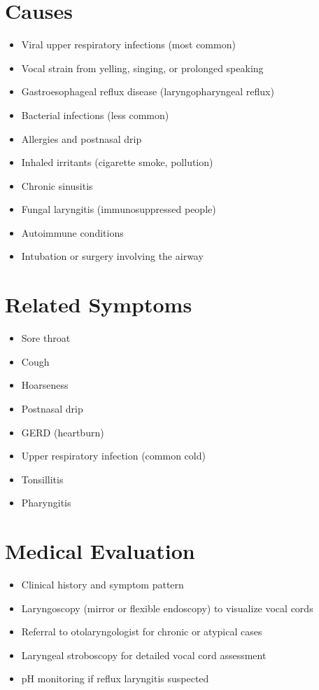 \section*{Causes}
\begin{itemize}
\item Viral upper respiratory infections (most common)
\item Vocal strain from yelling, singing, or prolonged speaking
\item Gastroesophageal reflux disease (laryngopharyngeal reflux)
\item Bacterial infections (less common)
\item Allergies and postnasal drip
\item Inhaled irritants (cigarette smoke, pollution)
\item Chronic sinusitis
\item Fungal laryngitis (immunosuppressed people)
\item Autoimmune conditions
\item Intubation or surgery involving the airway
\end{itemize}

\section*{Related Symptoms}
\begin{itemize}
\item Sore throat
\item Cough
\item Hoarseness
\item Postnasal drip
\item GERD (heartburn)
\item Upper respiratory infection (common cold)
\item Tonsillitis
\item Pharyngitis
\end{itemize}

\section*{Medical Evaluation}
\begin{itemize}
\item Clinical history and symptom pattern
\item Laryngoscopy (mirror or flexible endoscopy) to visualize vocal cords
\item Referral to otolaryngologist for chronic or atypical cases
\item Laryngeal stroboscopy for detailed vocal cord assessment
\item pH monitoring if reflux laryngitis suspected
\end{itemize}

